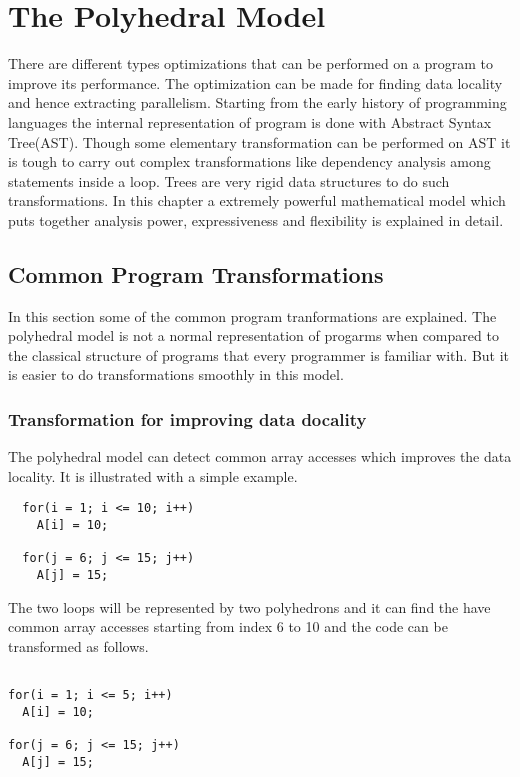 \documentclass[a4paper,12pt]{book}
\begin{document}
\chapter{The Polyhedral Model}

There are different types optimizations that can be performed on a program to improve its
performance. The optimization can be made for finding data locality and hence extracting
parallelism. Starting from the early history of programming languages the internal representation
of program is done with Abstract Syntax Tree(AST). Though some elementary transformation can
be performed on AST it is tough to carry out complex transformations like dependency analysis among
statements inside a loop. Trees are very rigid data structures to do such transformations.
In this chapter a extremely powerful mathematical model which puts together analysis power,
expressiveness and flexibility is explained in detail.

\section{Common Program Transformations}

In this section some of the common program tranformations are explained. The
polyhedral model is not a normal representation of progarms when compared to the
classical structure of programs that every programmer is familiar with. But
it is easier to do transformations smoothly in this model.

\subsection{Transformation for improving data docality}

The polyhedral model can detect common array accesses which improves the data locality. It is
illustrated with a simple example.
{\footnotesize
\begin{lstlisting}
  for(i = 1; i <= 10; i++)
    A[i] = 10;
  
  for(j = 6; j <= 15; j++)
    A[j] = 15;
\end{lstlisting}
}

The two loops will be represented by two polyhedrons and it can find the have common 
array accesses starting from index 6 to 10 and the code can be transformed as follows.

{\footnotesize
\begin{lstlisting}

for(i = 1; i <= 5; i++)
  A[i] = 10;

for(j = 6; j <= 15; j++)
  A[j] = 15;
\end{lstlisting}
}
  
\end{document}
